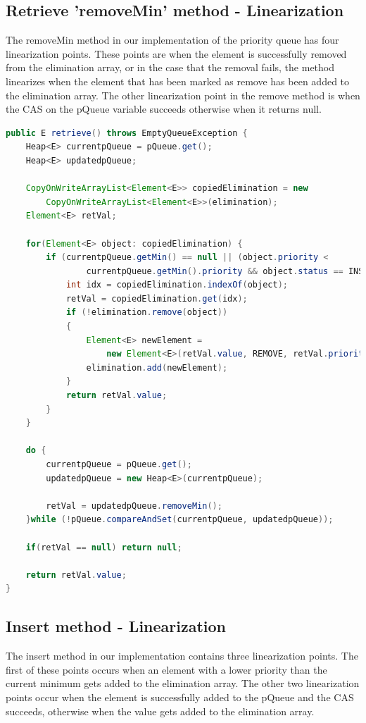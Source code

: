 \documentclass[10pt]{asme2ej}
\begin{document}
\subsection{Retrieve 'removeMin' method - Linearization}
The removeMin method in our implementation of the priority queue has four linearization points. These points are when the element is successfully removed from the elimination array, or in the case that the removal fails, the method linearizes when the element that has been marked as remove has been added to the elimination array. The other linearization point in the remove method is when the CAS on the pQueue variable succeeds otherwise when it returns null.

\begin{lstlisting}[language=Java]
public E retrieve() throws EmptyQueueException {
    Heap<E> currentpQueue = pQueue.get();
    Heap<E> updatedpQueue;

    CopyOnWriteArrayList<Element<E>> copiedElimination = new 
        CopyOnWriteArrayList<Element<E>>(elimination);
    Element<E> retVal;

    for(Element<E> object: copiedElimination) {
        if (currentpQueue.getMin() == null || (object.priority < 
                currentpQueue.getMin().priority && object.status == INSERT)) {
            int idx = copiedElimination.indexOf(object);
            retVal = copiedElimination.get(idx);
            if (!elimination.remove(object))
            {
                Element<E> newElement = 
                    new Element<E>(retVal.value, REMOVE, retVal.priority);
                elimination.add(newElement);
            }
            return retVal.value;
        }
    }

    do {
        currentpQueue = pQueue.get();
        updatedpQueue = new Heap<E>(currentpQueue);

        retVal = updatedpQueue.removeMin();
    }while (!pQueue.compareAndSet(currentpQueue, updatedpQueue));
    
    if(retVal == null) return null;

    return retVal.value;     
}
\end{lstlisting}

\subsection{Insert method - Linearization}
The insert method in our implementation contains three linearization points. The first of these points occurs when an element with a lower priority than the current minimum gets added to the elimination array. The other two linearization points occur when the element is successfully added to the pQueue and the CAS succeeds, otherwise when the value gets added to the elimination array.
\end{document}
